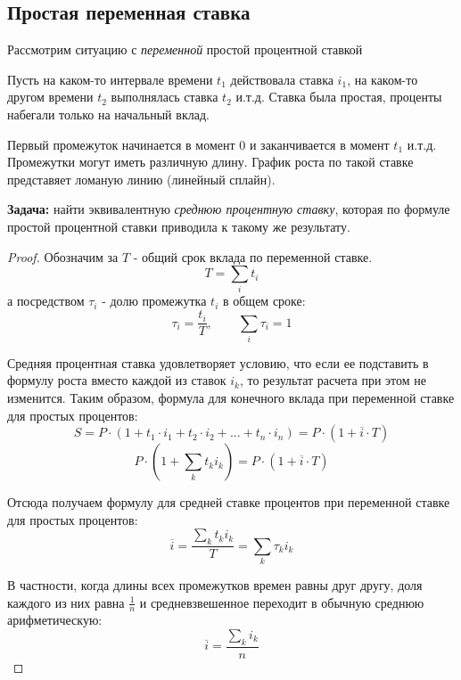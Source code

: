 \documentclass[aps,%
12pt,%
final,%
oneside,
onecolumn,%
musixtex, %
superscriptaddress,%
centertags]{article} %
\theoremstyle{plain}
\theoremstyle{definition}
\theoremstyle{remark}
\begin{document}
\subsection{Простая переменная ставка}

Рассмотрим ситуацию с \textit{переменной} простой процентной ставкой

Пусть на каком-то интервале времени $t_1$ действовала ставка $i_1$, на каком-то другом времени $t_2$ выполнялась ставка $t_2$ и.т.д. Ставка была простая, проценты набегали только на начальный вклад.

Первый промежуток начинается в момент $0$ и заканчивается в момент $t_1$ и.т.д. Промежутки могут иметь различную длину. График роста по такой ставке представяет ломаную линию (линейный сплайн).

\textbf{Задача:} найти эквивалентную \textit{среднюю процентную ставку}, которая по формуле простой процентной ставки приводила к такому же результату. 

\begin{center}
\end{center}

\begin{proof}
Обозначим за $T$ - общий срок вклада по переменной ставке.
$$ T =  \sum_{i}{t_i} $$
а посредством $\tau_i$ - долю промежутка $t_i$ в общем сроке:
$$\tau_i = \frac{t_i}{T}, \qquad \sum_i \tau_i = 1 $$

Средняя процентная ставка удовлетворяет условию, что если ее подставить в формулу роста вместо каждой из ставок $i_k$, то результат расчета при этом не изменится. Таким образом, формула для конечного вклада при переменной ставке для простых процентов:
$$ S = P \cdot (1+t_1 \cdot i_1 + t_2 \cdot i_2 + ... + t_n \cdot i_n) = P \cdot (1+ \overline{i}\cdot T)$$
$$P \cdot (1 + \sum\limits_k t_k i_k) =  P \cdot (1+ \overline{i}\cdot T)$$

Отсюда получаем формулу для средней ставке процентов при переменной ставке для простых процентов:
$$ \overline{i} = \frac{\sum\limits_k t_k i_k}{T} = \sum\limits_k \tau_k i_k$$

В частности, когда длины всех промежутков времен равны друг другу, доля каждого из них равна $\frac{1}{n}$ и средневзвешенное переходит в обычную среднюю арифметическую:
$$\overline{i} = \frac{\sum\limits_k i_k}{n}$$
\end{proof}
\end{document}
